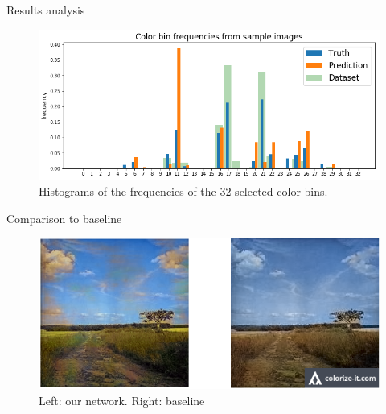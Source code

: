 \documentclass[final]{beamer}
\newlength{\onecolwid}
\begin{document}
\begin{frame}[t]
\begin{columns}[t]
\begin{column}{\onecolwid}

\begin{block}{Results analysis}


\begin{figure}
\begin{center}
\includegraphics[width=\linewidth]{histogram_compact}
\caption{Histograms of the frequencies of the 32 selected color bins.}
\label{histogram}
\end{center}
\end{figure}



\end{block}

\begin{block}{Comparison to baseline}
\begin{figure}
\begin{center}
\includegraphics[width=0.7\linewidth]{compare}
\caption{Left: our network. Right: baseline}
\label{histogram}
\end{center}
\end{figure}


\end{block}



\end{column}
\end{columns}
\end{frame}
\end{document}
